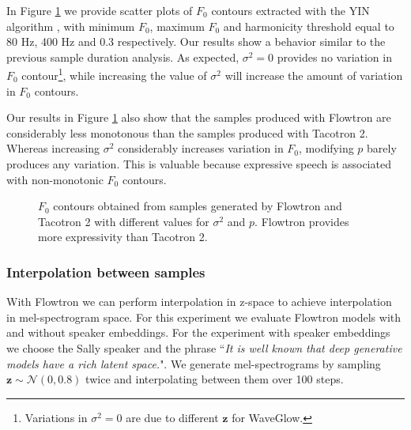 \documentclass{article}
\begin{document}
In Figure \ref{fig:pitch_contours} we provide scatter plots of $F_0$ contours extracted with the YIN algorithm \cite{de2002yin}, with minimum $F_0$, maximum $F_0$ and harmonicity threshold equal to 80 Hz, 400 Hz and 0.3 respectively. Our results show a behavior similar to the previous sample duration analysis. As expected, $\sigma^2=0$ provides no variation in $F_0$ contour\footnote{Variations in $\sigma^2=0$ are due to different $\boldsymbol{z}$ for WaveGlow.}, while increasing the value of $\sigma^2$ will increase the amount of variation in $F_0$ contours. 

Our results in Figure \ref{fig:pitch_contours} also show that the samples produced with Flowtron are considerably less monotonous than the samples produced with Tacotron 2. Whereas increasing $\sigma^2$ considerably increases variation in $F_0$, modifying $p$ barely produces any variation. This is valuable because expressive speech is associated with non-monotonic $F_0$ contours.

\begin{figure}[!ht]
    \centering
    
    
    
    \caption{$F_0$ contours obtained from samples generated by Flowtron and Tacotron 2 with different values for $\sigma^2$ and $p$. Flowtron provides more expressivity than Tacotron 2.}
    \label{fig:pitch_contours}
\end{figure}

\subsubsection{Interpolation between samples}
With Flowtron we can perform interpolation in z-space to achieve interpolation in mel-spectrogram space. For this experiment we evaluate Flowtron models with and without speaker embeddings. For the experiment with speaker embeddings we choose the Sally speaker and the phrase ``\textit{It is well known that deep generative models have a rich latent space.}". We generate mel-spectrograms by sampling  $\boldsymbol{z} \sim \mathcal{N}(0, 0.8)$ twice and interpolating between them over 100 steps. 
\end{document}
